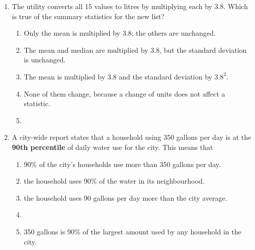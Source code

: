 \documentclass[12pt]{article}
\begin{document}
\begin{enumerate}[leftmargin=1.9em, itemsep=0.10in]
  \item The utility converts all 15 values to litres by multiplying each by 3.8. Which is
        true of the summary statistics for the new list?
        \begin{enumerate}[label=\textbf{(\Alph*)}, leftmargin=2.2em, itemsep=2pt]
          \item Only the mean is multiplied by 3.8; the others are unchanged.
          \item The mean and median are multiplied by 3.8, but the standard deviation is unchanged.
          \item The mean is multiplied by 3.8 and the standard deviation by $3.8^2$.
          \item None of them change, because a change of units does not affect a statistic.
          \item {}
                \par\rule{0pt}{0.25in}\hfill{}
        \end{enumerate}

  \item A city-wide report states that a household using 350 gallons per day is at the
        \textbf{90th percentile} of daily water use for the city. This means that
        \begin{enumerate}[label=\textbf{(\Alph*)}, leftmargin=2.2em, itemsep=2pt]
          \item 90\% of the city's households use more than 350 gallons per day.
          \item the household uses 90\% of the water in its neighbourhood.
          \item the household uses 90 gallons per day more than the city average.
          \item {}
          \item 350 gallons is 90\% of the largest amount used by any household in the city.
                \par\rule{0pt}{0.25in}\hfill{}
        \end{enumerate}

\end{enumerate}

\vspace{0.10in}
\end{document}
